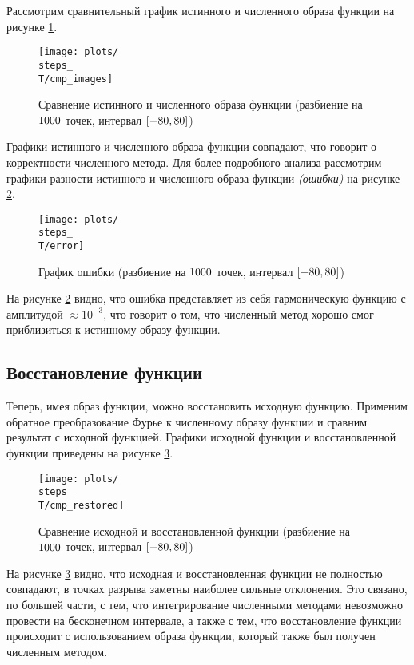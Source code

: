 Рассмотрим сравнительный график истинного и численного образа функции на рисунке \ref{fig:\steps_\T_cmp_images}.
\begin{figure}[ht!]
    \centering
    \texttt{[image: plots/\\steps\_\\T/cmp\_images]}
    \caption{Сравнение истинного и численного образа функции (разбиение на $1000$ точек, интервал $[-80, 80]$)}
    \label{fig:\steps_\T_cmp_images}
\end{figure}

Графики истинного и численного образа функции совпадают, что говорит о корректности
численного метода. Для более подробного анализа рассмотрим графики разности истинного и
численного образа функции \textit{(ошибки)} на рисунке \ref{fig:\steps_\T_error}.
\begin{figure}[ht!]
    \centering
    \texttt{[image: plots/\\steps\_\\T/error]}
    \caption{График ошибки (разбиение на $1000$ точек, интервал $[-80, 80]$)}
    \label{fig:\steps_\T_error}
\end{figure}
На рисунке \ref{fig:\steps_\T_error} видно, что ошибка представляет из себя гармоническую функцию
с амплитудой $\approx 10^{-3}$, что говорит о том, что численный метод хорошо смог приблизиться к истинному образу функции.

\subsection{Восстановление функции}
Теперь, имея образ функции, можно восстановить исходную функцию. Применим обратное преобразование Фурье к численному образу функции 
и сравним результат с исходной функцией. Графики исходной функции и восстановленной функции приведены на рисунке \ref{fig:\steps_\T_cmp_restored}.
\begin{figure}[ht!]
    \centering
    \texttt{[image: plots/\\steps\_\\T/cmp\_restored]}
    \caption{Сравнение исходной и восстановленной функции (разбиение на $1000$ точек, интервал $[-80, 80]$)}
    \label{fig:\steps_\T_cmp_restored}
\end{figure}
На рисунке \ref{fig:\steps_\T_cmp_restored} видно, что исходная и восстановленная функции не полностью совпадают, в точках разрыва 
заметны наиболее сильные отклонения. Это связано, по большей части, с тем, что интегрирование численными методами невозможно провести на 
бесконечном интервале, а также с тем, что восстановление функции происходит с использованием образа функции, который также был получен численным методом.

